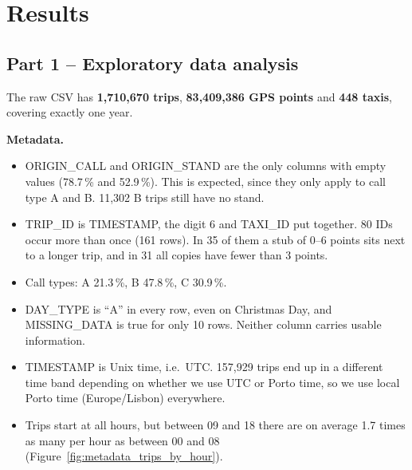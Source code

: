 \documentclass[12pt,a4paper]{article}
\begin{document}
\section*{Results}

\subsection*{Part 1 -- Exploratory data analysis}

The raw CSV has \textbf{1,710,670 trips}, \textbf{83,409,386 GPS points}
and \textbf{448 taxis}, covering exactly one year.

\textbf{Metadata.}
\begin{itemize}
  \item ORIGIN\_CALL and ORIGIN\_STAND are the only columns with empty values
        (78.7\,\% and 52.9\,\%). This is expected, since they only apply to
        call type A and B. 11,302 B trips still have no stand.
  \item TRIP\_ID is TIMESTAMP, the digit 6 and TAXI\_ID put together. 80 IDs
        occur more than once (161 rows). In 35 of them a stub of 0--6 points
        sits next to a longer trip, and in 31 all copies have fewer than
        3 points.
  \item Call types: A 21.3\,\%, B 47.8\,\%, C 30.9\,\%.
  \item DAY\_TYPE is ``A'' in every row, even on Christmas Day, and
        MISSING\_DATA is true for only 10 rows. Neither column carries
        usable information.
  \item TIMESTAMP is Unix time, i.e.\ UTC. 157,929 trips end up in a
        different time band depending on whether we use UTC or Porto time,
        so we use local Porto time (Europe/Lisbon) everywhere.
  \item Trips start at all hours, but between 09 and 18 there are on average
        1.7 times as many per hour as between 00 and 08
        (Figure~\ref{fig:metadata_trips_by_hour}).
\end{itemize}
\end{document}

